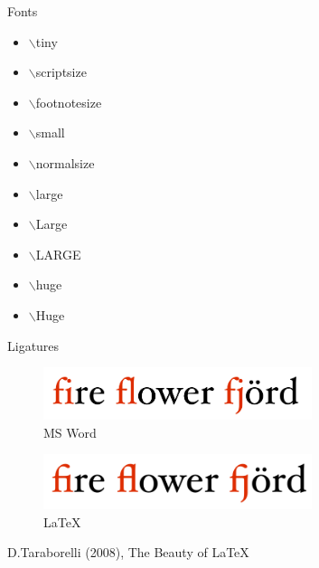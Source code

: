 \documentclass[10pt,xcolor=table]{beamer}
\begin{document}
\begin{frame}{Fonts}
\begin{itemize}
\item \tiny $\backslash$tiny
\item \scriptsize $\backslash$scriptsize
\item \footnotesize $\backslash$footnotesize
\item \small $\backslash$small
\item \normalsize $\backslash$normalsize
\item \large $\backslash$large
\item \Large $\backslash$Large
\item \LARGE $\backslash$LARGE
\item \huge $\backslash$huge
\item \Huge $\backslash$Huge
\end{itemize}
\end{frame}

\begin{frame}{Ligatures}
\begin{figure}
\centering
\includegraphics[width=0.7\textwidth]{figs/ligatures_word.png}
\caption{MS Word}
\end{figure}
\begin{figure}
\centering
\includegraphics[width=0.7\textwidth]{figs/ligatures_latex.png}
\caption{\LaTeX}
\end{figure}
\flushright
D.Taraborelli (2008), The Beauty of \LaTeX
\end{frame}



\end{document}
